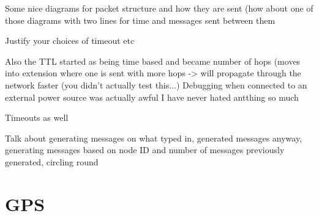 \documentclass[12pt,a4paper]{report}
\begin{document}
Some nice diagrams for packet structure and how they are sent (how about one of those diagrams with two lines for time and messages sent between them

Justify your choices of timeout etc

Also the TTL started as being time based and became number of hops (moves into extension where one is sent with more hops -> will propagate through the network faster (you didn't actually test this...)
Debugging when connected to an external power source was actually awful I have never hated antthing so much 


Timeouts as well

Talk about generating messages on what typed in, generated messages anyway, generating messages based on node ID and number of messages previously generated, circling round 


\section{GPS} 
\end{document}
